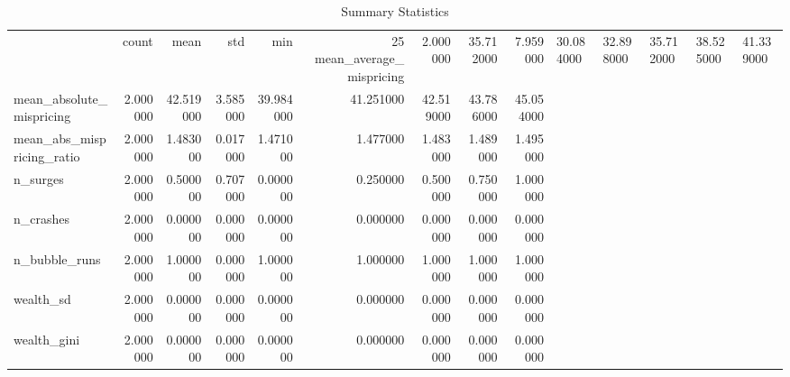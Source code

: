 \begin{table}[!htbp]
\centering
\caption{Summary Statistics}
\begin{tabular}{lrrrrrrrr}
\toprule
 & count & mean & std & min & 25%
\midrule
mean_average_mispricing & 2.000000 & 35.712000 & 7.959000 & 30.084000 & 32.898000 & 35.712000 & 38.525000 & 41.339000 \\
mean_absolute_mispricing & 2.000000 & 42.519000 & 3.585000 & 39.984000 & 41.251000 & 42.519000 & 43.786000 & 45.054000 \\
mean_abs_mispricing_ratio & 2.000000 & 1.483000 & 0.017000 & 1.471000 & 1.477000 & 1.483000 & 1.489000 & 1.495000 \\
n_surges & 2.000000 & 0.500000 & 0.707000 & 0.000000 & 0.250000 & 0.500000 & 0.750000 & 1.000000 \\
n_crashes & 2.000000 & 0.000000 & 0.000000 & 0.000000 & 0.000000 & 0.000000 & 0.000000 & 0.000000 \\
n_bubble_runs & 2.000000 & 1.000000 & 0.000000 & 1.000000 & 1.000000 & 1.000000 & 1.000000 & 1.000000 \\
wealth_sd & 2.000000 & 0.000000 & 0.000000 & 0.000000 & 0.000000 & 0.000000 & 0.000000 & 0.000000 \\
wealth_gini & 2.000000 & 0.000000 & 0.000000 & 0.000000 & 0.000000 & 0.000000 & 0.000000 & 0.000000 \\
\bottomrule
\end{tabular}

\end{table}